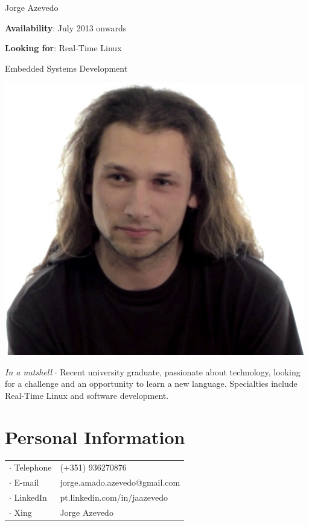 



\topSection
{
	{\Huge Jorge Azevedo}

	\vspace{1.5mm}
	\vspace*{10mm}

	\textbf{Availability}: July 2013 onwards

	\textbf{Looking for}: Real-Time Linux

	\hspace{66pt}Embedded Systems Development
} {
	\includegraphics[width=0.985\textwidth]{img/photo}
}

\emph{In a nutshell} $\cdot$  Recent university graduate, passionate about
technology, looking for a challenge and an opportunity to learn a new language.
Specialties include Real-Time Linux and software development.

\section*{Personal Information}

{
\begin{tabular}[t]{@{}l l}
	$\cdot$  Telephone & (+351) 936270876 \\
	$\cdot$  E-mail & jorge.amado.azevedo@gmail.com \\
	$\cdot$  LinkedIn & pt.linkedin.com/in/jaazevedo\\
	$\cdot$  Xing & Jorge Azevedo\\
\end{tabular}
}

